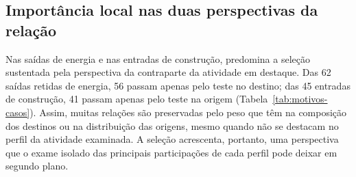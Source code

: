 \subsection{Importância local nas duas perspectivas da relação}

Nas saídas de energia e nas entradas de construção, predomina a seleção sustentada pela perspectiva da contraparte da atividade em destaque. Das 62 saídas retidas de energia, 56 passam apenas pelo teste no destino; das 45 entradas de construção, 41 passam apenas pelo teste na origem (Tabela~\ref{tab:motivos-casos}). Assim, muitas relações são preservadas pelo peso que têm na composição dos destinos ou na distribuição das origens, mesmo quando não se destacam no perfil da atividade examinada. A seleção acrescenta, portanto, uma perspectiva que o exame isolado das principais participações de cada perfil pode deixar em segundo plano.

